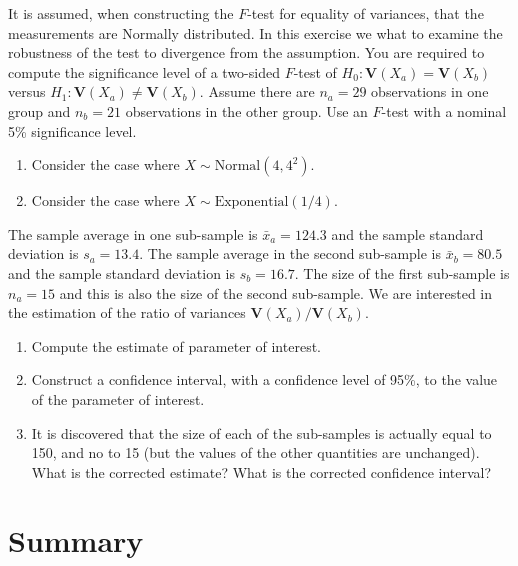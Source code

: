 \documentclass[]{krantz}
\newcommand{\Var}{\mathbf{V}}
\theoremstyle{definition}
\theoremstyle{definition}
\theoremstyle{definition}
\theoremstyle{remark}
\let\BeginKnitrBlock\begin \let\EndKnitrBlock\end
\begin{document}
\BeginKnitrBlock{exercise}
\protect\hypertarget{exr:unnamed-chunk-203}{}{\label{exr:unnamed-chunk-203} }It is assumed, when constructing the \(F\)-test for
equality of variances, that the measurements are Normally distributed.
In this exercise we what to examine the robustness of the test to
divergence from the assumption. You are required to compute the
significance level of a two-sided \(F\)-test of \(H_0:\Var(X_a)=\Var(X_b)\)
versus \(H_1: \Var(X_a)\not =\Var(X_b)\). Assume there are \(n_a=29\)
observations in one group and \(n_b = 21\) observations in the other
group. Use an \(F\)-test with a nominal 5\% significance level.

\begin{enumerate}
\def\labelenumi{\arabic{enumi}.}
\item
  Consider the case where \(X \sim \mathrm{Normal}(4,4^2)\).
\item
  Consider the case where \(X \sim \mathrm{Exponential}(1/4)\).
\end{enumerate}
\EndKnitrBlock{exercise}

\BeginKnitrBlock{exercise}
\protect\hypertarget{exr:unnamed-chunk-204}{}{\label{exr:unnamed-chunk-204} }The sample average in one sub-sample is
\(\bar x_a = 124.3\) and the sample standard deviation is \(s_a = 13.4\).
The sample average in the second sub-sample is \(\bar x_b = 80.5\) and the
sample standard deviation is \(s_b = 16.7\). The size of the first
sub-sample is \(n_a=15\) and this is also the size of the second
sub-sample. We are interested in the estimation of the ratio of
variances \(\Var(X_a)/\Var(X_b)\).

\begin{enumerate}
\def\labelenumi{\arabic{enumi}.}
\item
  Compute the estimate of parameter of interest.
\item
  Construct a confidence interval, with a confidence level of 95\%, to
  the value of the parameter of interest.
\item
  It is discovered that the size of each of the sub-samples is
  actually equal to 150, and no to 15 (but the values of the other
  quantities are unchanged). What is the corrected estimate? What is
  the corrected confidence interval?
\end{enumerate}
\EndKnitrBlock{exercise}

\hypertarget{summary-11}{%
\section{Summary}\label{summary-11}}
\end{document}
